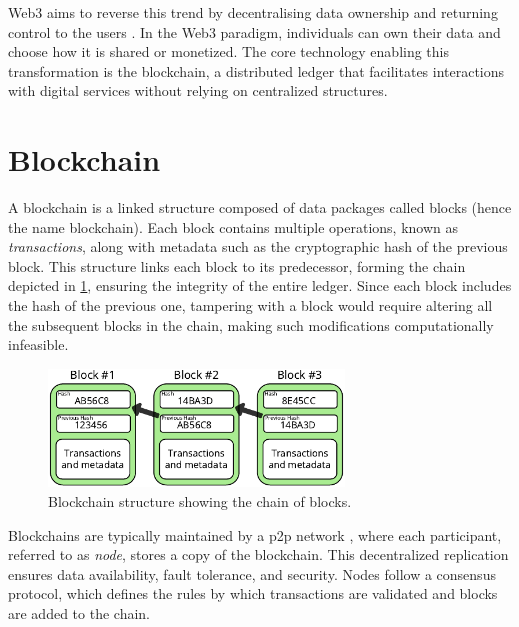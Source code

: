 Web3 aims to reverse this trend by decentralising data ownership and returning control to the users \cite{sheridan2022web3}\cite{ray2023web3}. In the Web3 paradigm, individuals can own their data and choose how it is shared or monetized. The core technology enabling this transformation is the blockchain, a distributed ledger that facilitates interactions with digital services without relying on centralized structures.

\section{Blockchain}
A blockchain \cite{nofer2017blockchain} is a linked structure composed of data packages called blocks (hence the name blockchain). Each block contains multiple operations, known as \textit{transactions}, along with metadata such as the cryptographic \gls{hash} of the previous block. This structure links each block to its predecessor, forming the chain depicted in \cref{fig:blockchainStructure}, ensuring the integrity of the entire ledger. Since each block includes the \gls{hash} of the previous one, tampering with a block would require altering all the subsequent blocks in the chain, making such modifications computationally infeasible. 
\begin{figure}
  \centering
  \includegraphics[width=0.7\textwidth]{figures/blockchain.pdf}
  \caption[Blockchain structure]{Blockchain structure showing the chain of blocks.}
  \label{fig:blockchainStructure}
\end{figure}

Blockchains are typically maintained by a \gls{p2p} network \cite{irani2018blockchain}, where each participant, referred to as \textit{node}, stores a copy of the blockchain. This decentralized replication ensures data availability, fault tolerance, and security. Nodes follow a consensus protocol, which defines the rules by which transactions are validated and blocks are added to the chain. 


